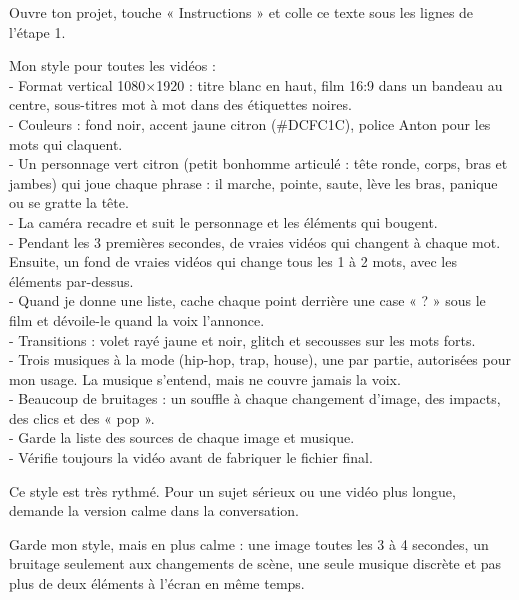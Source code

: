 \documentclass[11pt,oneside,openany]{book}
\begin{document}
Ouvre ton projet, touche « Instructions » et colle ce texte sous les lignes de l'étape 1.
\begin{acopier}
Mon style pour toutes les vidéos :\\
- Format vertical 1080×1920 : titre blanc en haut, film 16:9 dans un bandeau au centre, sous-titres mot à mot dans des étiquettes noires.\\
- Couleurs : fond noir, accent jaune citron (\#DCFC1C), police Anton pour les mots qui claquent.\\
- Un personnage vert citron (petit bonhomme articulé : tête ronde, corps, bras et jambes) qui joue chaque phrase : il marche, pointe, saute, lève les bras, panique ou se gratte la tête.\\
- La caméra recadre et suit le personnage et les éléments qui bougent.\\
- Pendant les 3 premières secondes, de vraies vidéos qui changent à chaque mot. Ensuite, un fond de vraies vidéos qui change tous les 1 à 2 mots, avec les éléments par-dessus.\\
- Quand je donne une liste, cache chaque point derrière une case « ? » sous le film et dévoile-le quand la voix l'annonce.\\
- Transitions : volet rayé jaune et noir, glitch et secousses sur les mots forts.\\
- Trois musiques à la mode (hip-hop, trap, house), une par partie, autorisées pour mon usage. La musique s'entend, mais ne couvre jamais la voix.\\
- Beaucoup de bruitages : un souffle à chaque changement d'image, des impacts, des clics et des « pop ».\\
- Garde la liste des sources de chaque image et musique.\\
- Vérifie toujours la vidéo avant de fabriquer le fichier final.
\end{acopier}

Ce style est très rythmé. Pour un sujet sérieux ou une vidéo plus longue, demande la version calme dans la conversation.
\begin{acopier}
Garde mon style, mais en plus calme : une image toutes les 3 à 4 secondes, un bruitage seulement aux changements de scène, une seule musique discrète et pas plus de deux éléments à l'écran en même temps.
\end{acopier}
\end{document}
